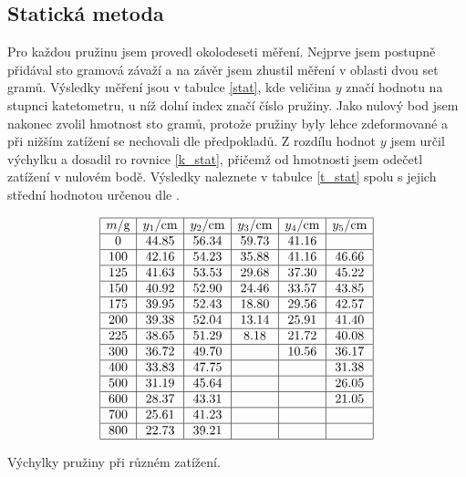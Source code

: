 \documentclass[a4paper,12pt]{article}
\begin{document}
\subsection{Statická metoda}
Pro každou pružinu jsem provedl okolodeseti měření. Nejprve jsem postupně přidával sto gramová závaží 
a na závěr jsem zhustil měření v oblasti dvou set gramů. Výsledky měření jsou v tabulce \ref{stat}, kde 
veličina $y$ značí hodnotu na stupnci katetometru, u níž dolní index značí číslo pružiny. Jako nulový 
bod jsem nakonec zvolil hmotnost sto gramů, protože pružiny byly lehce zdeformované a při nižším zatížení 
se nechovali dle předpokladů. Z rozdílu hodnot $y$ jsem určil výchylku a dosadil ro rovnice \ref{k_stat}, 
přičemž od hmotnosti jsem odečetl zatížení v nulovém bodě. Výsledky naleznete v tabulce \ref{t_stat} spolu 
s jejich střední hodnotou určenou dle \cite{chyba}.

\begin{table}
$$
\begin{array}{|c|c|c|c|c|c|}
\hline
m/\mbox{g}&	y_1/\mbox{cm}&	y_2/\mbox{cm}&	y_3/\mbox{cm}&	y_4/\mbox{cm}&	y_5/\mbox{cm}	\\ \hline	
0&	44.85&	56.34&	59.73&	41.16&		\\ \hline
100&	42.16&	54.23&	35.88&	41.16&	46.66	\\ \hline
125&	41.63&	53.53&	29.68&	37.30&	45.22	\\ \hline
150&	40.92&	52.90&	24.46&	33.57&	43.85	\\ \hline
175&	39.95&	52.43&	18.80&	29.56&	42.57	\\ \hline
200&	39.38&	52.04&	13.14&	25.91&	41.40	\\ \hline
225&	38.65&	51.29&	8.18&	21.72&	40.08	\\ \hline
300&	36.72&	49.70&	&	10.56&	36.17	\\ \hline
400&	33.83&	47.75&	&	&	31.38	\\ \hline
500&	31.19&	45.64&	&	&	26.05	\\ \hline
600&	28.37&	43.31&	&	&	21.05	\\ \hline
700&	25.61&	41.23&	&	&		\\ \hline
800&	22.73&	39.21&	&	&		\\ \hline
\end{array}
$$
\caption{Výchylky pružiny při různém zatížení.}
\label{stat}
\end{table}
\end{document}
